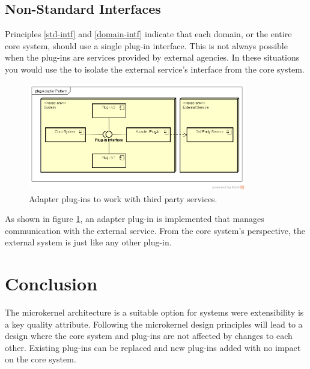 \subsection{Non-Standard Interfaces}

Principles \ref{std-intf} and \ref{domain-intf} indicate that each domain, or the entire core system, should use a single plug-in interface.
This is not always possible when the plug-ins are services provided by external agencies.
In these situations you would use the 
to isolate the external service's interface from the core system.

\begin{figure}[h!]
    \centering
    \includegraphics[trim=38 58 20 45,clip,width=0.85\textwidth]{diagrams/adapter-plug-in.png}
    \caption{Adapter plug-ins to work with third party services.}
    \label{fig:adapter}
\end{figure}

As shown in figure \ref{fig:adapter}, an adapter plug-in is implemented that manages communication with the external service.
From the core system's perspective, the external system is just like any other plug-in.


\section{Conclusion}

The microkernel architecture is a suitable option for systems were extensibility is a key quality attribute.
Following the microkernel design principles will lead to a design where the core system and plug-ins are not affected by changes to each other.
Existing plug-ins can be replaced and new plug-ins added with no impact on the core system.
